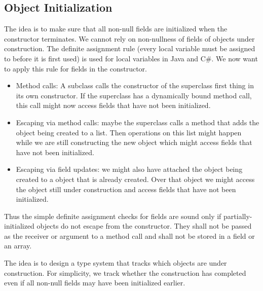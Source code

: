 \subsection{Object Initialization}
\begin{mytitle} The idea is to make sure that all non-null fields are initialized when the constructor terminates. We cannot rely on non-nullness of fields of objects under construction. The definite assignment rule (every local variable must be assigned to before it is first used) is used for local variables in Java and C\#. We now want to apply this rule for fields in the constructor.
\end{mytitle}
\begin{mytitle}[Problems]\hfill
\begin{itemize}
    \item Method calls: A subclass calls the constructor of the superclass first thing in its own constructor. If the superclass has a dynamically bound method call, this call might now access fields that have not been initialized.
    \item Escaping via method calls: maybe the superclass calls a method that adds the object being created to a list. Then operations on this list might happen while we are still constructing the new object which might access fields that have not been initialized.
    \item Escaping via field updates: we might also have attached the object being created to a object that is already created. Over that object we might access the object still under construction and access fields that have not been initialized.
\end{itemize}
Thus the simple definite assignment checks for fields are sound only if partially-initialized objects do not escape from the constructor. They shall not be passed as the receiver or argument to a method call and shall not be stored in a field or an array.
\end{mytitle}
\begin{mytitle} The idea is to design a type system that tracks which objects are under construction. For simplicity, we track whether the construction has completed even if all non-null fields may have been initialized earlier.
\end{mytitle}
